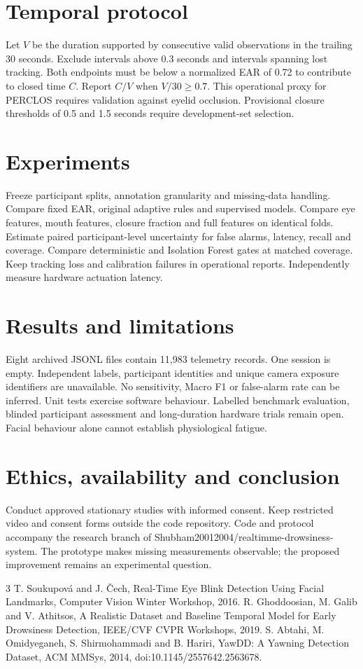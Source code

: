 \documentclass[conference]{IEEEtran}
\begin{document}
\section{Temporal protocol}
Let $V$ be the duration supported by consecutive valid observations in the trailing 30 seconds. Exclude intervals above 0.3 seconds and intervals spanning lost tracking. Both endpoints must be below a normalized EAR of 0.72 to contribute to closed time $C$. Report $C/V$ when $V/30\ge0.7$. This operational proxy for PERCLOS requires validation against eyelid occlusion. Provisional closure thresholds of 0.5 and 1.5 seconds require development-set selection.
\section{Experiments}
Freeze participant splits, annotation granularity and missing-data handling. Compare fixed EAR, original adaptive rules and supervised models. Compare eye features, mouth features, closure fraction and full features on identical folds. Estimate paired participant-level uncertainty for false alarms, latency, recall and coverage. Compare deterministic and Isolation Forest gates at matched coverage. Keep tracking loss and calibration failures in operational reports. Independently measure hardware actuation latency.
\section{Results and limitations}
Eight archived JSONL files contain 11,983 telemetry records. One session is empty. Independent labels, participant identities and unique camera exposure identifiers are unavailable. No sensitivity, Macro F1 or false-alarm rate can be inferred. Unit tests exercise software behaviour. Labelled benchmark evaluation, blinded participant assessment and long-duration hardware trials remain open. Facial behaviour alone cannot establish physiological fatigue.
\section{Ethics, availability and conclusion}
Conduct approved stationary studies with informed consent. Keep restricted video and consent forms outside the code repository. Code and protocol accompany the research branch of Shubham20012004/realtimme-drowsiness-system. The prototype makes missing measurements observable; the proposed improvement remains an experimental question.
\begin{thebibliography}{3}
 T. Soukupov\'a and J. \v{C}ech, Real-Time Eye Blink Detection Using Facial Landmarks, Computer Vision Winter Workshop, 2016.
 R. Ghoddoosian, M. Galib and V. Athitsos, A Realistic Dataset and Baseline Temporal Model for Early Drowsiness Detection, IEEE/CVF CVPR Workshops, 2019.
 S. Abtahi, M. Omidyeganeh, S. Shirmohammadi and B. Hariri, YawDD: A Yawning Detection Dataset, ACM MMSys, 2014, doi:10.1145/2557642.2563678.
\end{thebibliography}
\end{document}
